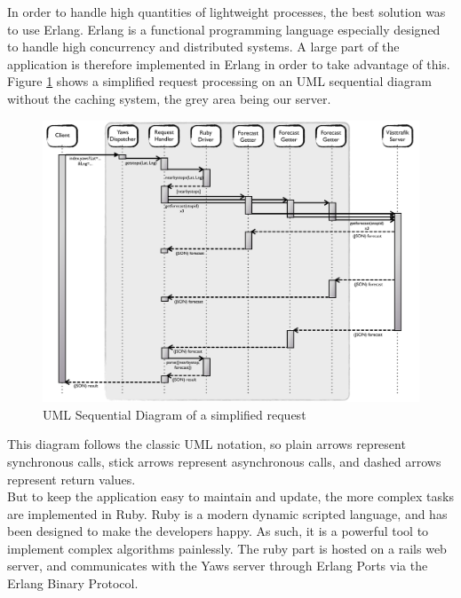 In order to handle high quantities of lightweight processes, the best solution was to use Erlang. Erlang is a functional programming language especially designed to handle high concurrency and distributed systems.  A large part of the application is therefore implemented in Erlang in order to take advantage of this.\\

Figure \ref{fig:message_passing} shows a simplified request processing on an UML sequential diagram without the caching system, the grey area being our server.\\

\begin{figure}[ht]
\center
\includegraphics[scale=0.4]{pics/message_passing}
\caption{UML Sequential Diagram of a simplified request}
\label{fig:message_passing}
\end{figure}

This diagram follows the classic UML notation, so plain arrows represent synchronous calls, stick arrows represent asynchronous calls, and dashed arrows represent return values. \\

But to keep the application easy to maintain and update, the more complex tasks are implemented in Ruby. Ruby is a modern dynamic scripted language, and has been designed to make the developers happy. As such, it is a powerful tool to implement complex algorithms painlessly. The ruby part is hosted on a rails web server, and communicates with the Yaws server through Erlang Ports via the Erlang Binary Protocol.\\

